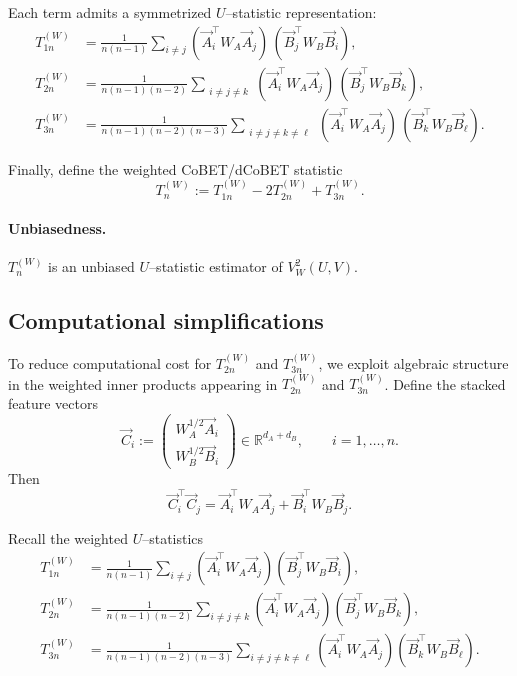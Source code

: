 \documentclass[12pt,reqno,oneside]{amsbook}
\theoremstyle{definition}
\theoremstyle{remark}
\begin{document}
Each term admits a symmetrized $U$--statistic representation:
\[
\begin{aligned}
T_{1n}^{(W)}
&=
\frac{1}{n(n-1)}
\sum_{i\neq j}
(\vec A_i^\top W_A \vec A_j)\,(\vec B_j^\top W_B \vec B_i),\\
T_{2n}^{(W)}
&=
\frac{1}{n(n-1)(n-2)}
\sum_{\substack{i\neq j\neq k }}
(\vec A_i^\top W_A \vec A_j)\,(\vec B_j^\top W_B \vec B_k),\\
T_{3n}^{(W)}
&=
\frac{1}{n(n-1)(n-2)(n-3)}
\sum_{\substack{i\neq j \neq k \neq \ell}}
(\vec A_i^\top W_A \vec A_j)\,(\vec B_k^\top W_B \vec B_\ell).
\end{aligned}
\]

Finally, define the weighted CoBET/dCoBET statistic
\[
T_n^{(W)}:=T_{1n}^{(W)}-2T_{2n}^{(W)}+T_{3n}^{(W)}.
\]

\paragraph{Unbiasedness.}
$T_n^{(W)}$ is an unbiased $U$--statistic estimator
of $V_W^2(U,V)$.

\subsection{Computational simplifications}
\label{computational_simp}
To reduce computational cost for $T_{2n}^{(W)}$ and $T_{3n}^{(W)}$, we exploit algebraic structure in the weighted
inner products appearing in $T_{2n}^{(W)}$ and $T_{3n}^{(W)}$.
Define the stacked feature vectors
\[
\vec C_i :=
\begin{pmatrix}
W_A^{1/2} \vec A_i\\
W_B^{1/2} \vec B_i
\end{pmatrix}
\in \mathbb{R}^{d_A+d_B},
\qquad i=1,\dots,n.
\]
Then
\[
\vec C_i^\top \vec C_j
=
\vec A_i^\top W_A \vec A_j
+
\vec B_i^\top W_B \vec B_j .
\]

Recall the weighted $U$--statistics
\[
\begin{aligned}
T_{1n}^{(W)}
&=
\frac{1}{n(n-1)}
\sum_{i\neq j}
(\vec A_i^\top W_A \vec A_j)(\vec B_j^\top W_B \vec B_i),\\
T_{2n}^{(W)}
&=
\frac{1}{n(n-1)(n-2)}
\sum_{i\neq j\neq k}
(\vec A_i^\top W_A \vec A_j)(\vec B_j^\top W_B \vec B_k),\\
T_{3n}^{(W)}
&=
\frac{1}{n(n-1)(n-2)(n-3)}
\sum_{i\neq j\neq k\neq \ell}
(\vec A_i^\top W_A \vec A_j)(\vec B_k^\top W_B \vec B_\ell).
\end{aligned}
\]
\end{document}
